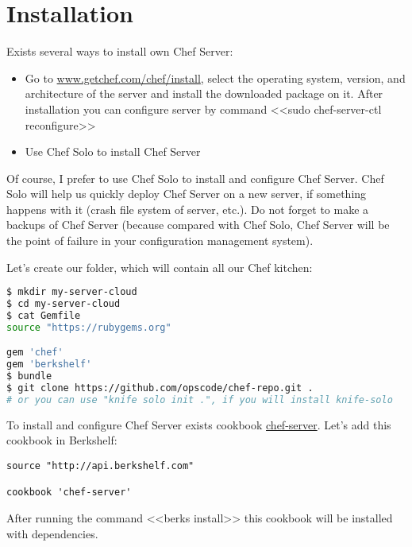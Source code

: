 \section{Installation}
\label{sec:server-installation}

Exists several ways to install own Chef Server:

\begin{itemize}
  \item Go to \href{http://www.getchef.com/chef/install/}{www.getchef.com/chef/install}, select the operating system, version, and architecture of the server and install the downloaded package on it. After installation you can configure server by command <<sudo chef-server-ctl reconfigure>>
  \item Use Chef Solo to install Chef Server
\end{itemize}

Of course, I prefer to use Chef Solo to install and configure Chef Server. Chef Solo will help us quickly deploy Chef Server on a new server, if something happens with it (crash file system of server, etc.). Do not forget to make a backups of Chef Server (because compared with Chef Solo, Chef Server will be the point of failure in your configuration management system).

Let's create our folder, which will contain all our Chef kitchen:

\begin{lstlisting}[language=Bash,label=lst:my-server-cloud-installation1]
$ mkdir my-server-cloud
$ cd my-server-cloud
$ cat Gemfile
source "https://rubygems.org"

gem 'chef'
gem 'berkshelf'
$ bundle
$ git clone https://github.com/opscode/chef-repo.git .
# or you can use "knife solo init .", if you will install knife-solo
\end{lstlisting}

To install and configure Chef Server exists cookbook \href{https://supermarket.getchef.com/cookbooks/chef-server}{chef-server}. Let's add this cookbook in Berkshelf:

\begin{lstlisting}[label=lst:my-server-cloud-installation2,title=my-server-cloud/Berkshelf]
source "http://api.berkshelf.com"

cookbook 'chef-server'
\end{lstlisting}

After running the command <<berks install>> this cookbook will be installed with dependencies.

